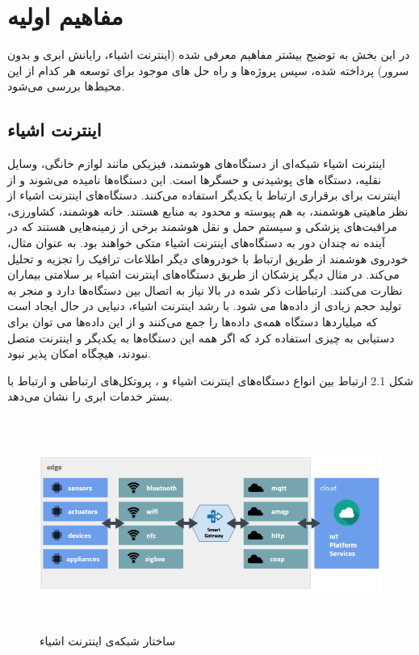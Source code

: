 \chapter{مفاهیم اولیه‌}\label{chapter2}

در این بخش به توضیح بیشتر مفاهیم معرفی شده (اینترنت اشیاء، رایانش ابری و بدون سرور) پرداخته شده، سپس پروژه‌ها و راه حل های موجود برای توسعه هر کدام از این محیط‌ها بررسی می‌شود.

\section{اینترنت اشیاء}

اینترنت اشیاء شبکه‌ای از دستگاه‌های هوشمند، فیزیکی مانند لوازم خانگی، وسایل نقلیه، دستگاه های پوشیدنی و حسگرها است. این دستگاه‌ها  نامیده می‌شوند و از اینترنت برای برقراری ارتباط با یکدیگر استفاده می‌کنند. دستگاه‌های اینترنت اشیاء از نظر ماهیتی هوشمند، به هم پیوسته و محدود به منابع هستند. خانه هوشمند‌، کشاورزی‌، مراقبت‌های پزشکی‌ و سیستم حمل و نقل هوشمند برخی از زمینه‌هایی هستند که در آینده‌ نه چندان دور به دستگاه‌های اینترنت اشیاء متکی خواهند بود. به عنوان مثال، خودرو‌ی هوشمند از طریق ارتباط با خودروهای دیگر اطلاعات ترافیک را تجزیه و تحلیل می‌کند. در مثال دیگر پزشکان از طریق دستگاه‌های اینترنت اشیاء بر سلامتی بیماران نظارت می‌کنند. ارتباطات ذکر شده در بالا نیاز به اتصال بین دستگاه‌ها دارد و منجر به تولید حجم زیادی از داده‌ها می شود. با رشد اینترنت اشیاء، دنیایی در حال ایجاد است که میلیاردها دستگاه همه‌ی داده‌ها را جمع می‌کنند و از این داده‌ها می توان برای دستیابی به چیزی استفاده کرد که اگر همه این دستگاه‌ها به یکدیگر و اینترنت متصل نبودند، هیچگاه امکان پذیر نبود.

شکل 2.1 ارتباط بین  انواع دستگاه‌های اینترنت اشیاء و ، پروتکل‌های ارتباطی و ارتباط با بستر خدمات ابری را نشان می‌دهد. 

\begin{figure}[!h]
	\centering
	\includegraphics[height=7cm]{images/IoT_explained}
	\caption{ساختار شبکه‌ی اینترنت اشیاء}
	\label{تصویر 2-1}
\end{figure}


